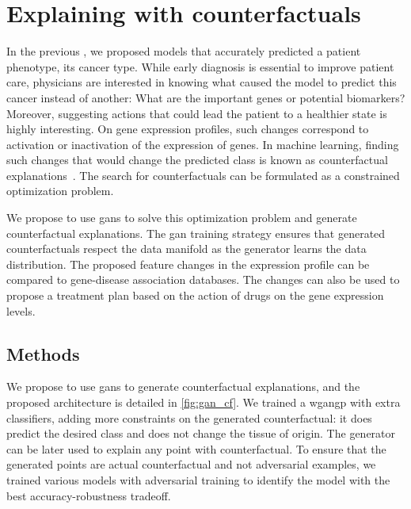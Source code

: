 \documentclass[../main.tex]{subfiles}
\begin{document}
\chapter{Explaining with counterfactuals}\label{chap:counterfactuals}
\minitoc

In the previous , we proposed models that accurately predicted a patient phenotype, \ie{}its cancer type.
While early diagnosis is essential to improve patient care, physicians are interested in knowing what caused the model to predict this cancer instead of another: What are the important genes or potential biomarkers?
Moreover, suggesting actions that could lead the patient to a healthier state is highly interesting.
On gene expression profiles, such changes correspond to activation or inactivation of the expression of genes.
In machine learning, finding such changes that would change the predicted class is known as counterfactual explanations~\cite{wachter2017counterfactual}.
The search for counterfactuals can be formulated as a constrained optimization problem.

We propose to use \glspl{gan} to solve this optimization problem and generate counterfactual explanations.
The \gls{gan} training strategy ensures that generated counterfactuals respect the data manifold as the generator learns the data distribution.
The proposed feature changes in the expression profile can be compared to gene-disease association databases.
The changes can also be used to propose a treatment plan based on the action of drugs on the gene expression levels.

\section{Methods}
	We propose to use \glspl{gan} to generate counterfactual explanations, and the proposed architecture is detailed in \cref{fig:gan_cf}.
	We trained a \gls{wgangp} with extra classifiers, adding more constraints on the generated counterfactual: it does predict the desired class and does not change the tissue of origin.
	The generator can be later used to explain any point with counterfactual.
	To ensure that the generated points are actual counterfactual and not adversarial examples, we trained various models with adversarial training to identify the model with the best accuracy-robustness tradeoff.
\end{document}
